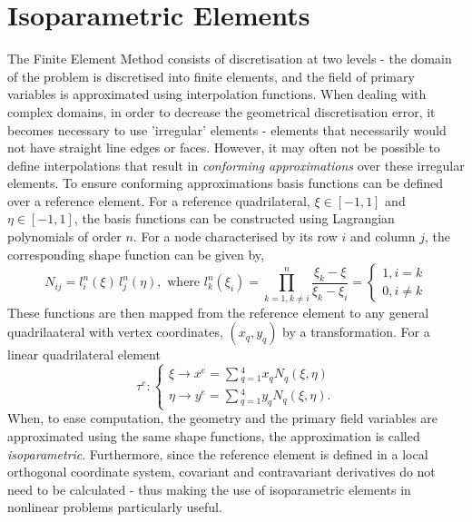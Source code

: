 \section{Isoparametric Elements} \label{sec:isoparametric_theory}
The Finite Element Method consists of discretisation at two levels - the domain of the problem is discretised into finite elements, and the field of primary variables
 is approximated using interpolation functions. When dealing with complex domains, in order to decrease the geometrical discretisation error, it becomes necessary to
 use 'irregular' elements - elements that necessarily would not have straight line edges or faces.
 However, it may often not be possible to define interpolations that result in \emph{conforming approximations} over these irregular elements. 
To ensure conforming approximations basis functions can be defined over a reference element. For a reference quadrilateral,
 $\xi \in [-1,1]$ and $\eta \in [-1, 1]$, the basis functions can be constructed using Lagrangian polynomials of order $n$.
 For a node characterised by its row $i$ and column $j$, the corresponding shape function can be given by,
 \begin{equation}
    N_{ij} = l^{n}_{i}(\xi) \, l^{n}_{j}(\eta), \text{ where } l^{n}_{k}(\xi_{i}) = \prod^{n}_{k = 1, k \neq i} \frac{\xi_{k} - \xi}{\xi_{k} - \xi_{i}} = \begin{cases} 
        1, i = k \\
        0, i \neq k
    \end{cases}
\end{equation} 
These functions are then mapped from the reference element to any general quadrilaateral with vertex coordinates, $(x_{q}, y_{q})$ by a transformation. For a linear
 quadrilateral element 
\begin{equation}
    \tau^{e}: \begin{cases}
        \xi \rightarrow x^{e} = \sum \limits{^{4}_{q=1}} x_{q} N_{q}(\xi, \eta)\\
        \eta \rightarrow y^{e} = \sum \limits{^{4}_{q=1}} y_{q} N_{q}(\xi, \eta).
    \end{cases}
\end{equation}
When, to ease computation, the geometry and the primary field variables are approximated using the same shape functions, the approximation is called \emph{isoparametric}.
Furthermore, since the reference element is defined in a local orthogonal coordinate system, covariant and contravariant derivatives do not need to be
 calculated - thus making the use of isoparametric elements in nonlinear problems particularly useful.
